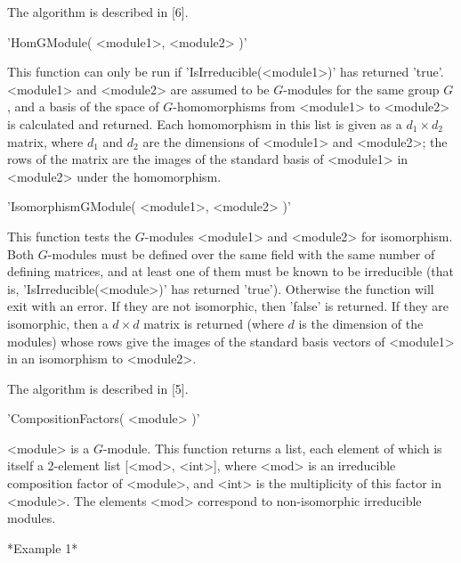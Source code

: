 The algorithm is described in [6].


'HomGModule( <module1>, <module2> )'

This function can only be run  if 'IsIrreducible(<module1>)' has returned
'true'. <module1>  and  <module2> are assumed  to  be $G$-modules for the
same  group  $G$, and a   basis of the   space  of $G$-homomorphisms from
<module1> to <module2> is  calculated and returned. Each  homomorphism in
this list  is given as  a $d_1 \times  d_2$ matrix, where $d_1$ and $d_2$
are the dimensions of <module1> and <module2>; the rows of the matrix are
the images of   the standard basis  of  <module1> in <module2>  under the
homomorphism.


'IsomorphismGModule( <module1>, <module2> )'

This  function tests    the $G$-modules   <module1>  and <module2>    for
isomorphism.  Both  $G$-modules must be  defined over the same field with
the same  number of defining  matrices, and at least  one of them must be
known to be irreducible  (that is, 'IsIrreducible(<module>)' has returned
'true').  Otherwise  the function will exit with  an  error.  If they are
not isomorphic, then 'false' is returned.  If they are isomorphic, then a
$d  \times  d$ matrix is  returned  (where $d$ is  the   dimension of the
modules)  whose rows  give the images   of the standard basis vectors  of
<module1> in an isomorphism to <module2>.

The algorithm is described in [5].


'CompositionFactors( <module> )'

<module> is a $G$-module.  This function  returns a list, each element of
which is  itself  a  2-element list  [<mod>, <int>],  where  <mod> is  an
irreducible composition factor of <module>, and <int> is the multiplicity
of  this   factor  in  <module>.    The   elements  <mod>  correspond  to
non-isomorphic irreducible modules.


*Example 1*


